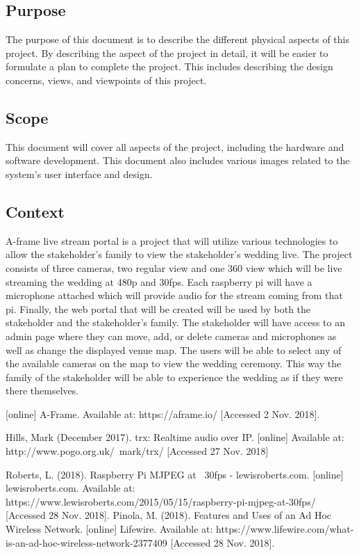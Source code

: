 \documentclass[onecolumn, draftclsnofoot,10pt, compsoc]{IEEEtran}
\begin{document}
    \subsection{Purpose}
    The purpose of this document is to describe the different physical aspects of this project.
    By describing the aspect of the project in detail, it will be easier to formulate a plan to complete the project.
    This includes describing the design concerns, views, and viewpoints of this project.
    
    \subsection{Scope}
    This document will cover all aspects of the project, including the hardware and software development.
    This document also includes various images related to the system's user interface and design.
    
    \subsection{Context}
    A-frame live stream portal is a project that will utilize various technologies to allow the stakeholder's family to view the stakeholder's wedding live.
    The project consists of three cameras, two regular view and one 360 view which will be live streaming the wedding at 480p and 30fps. 
    Each raspberry pi will have a microphone attached which will provide audio for the stream coming from that pi.
    Finally, the web portal that will be created will be used by both the stakeholder and the stakeholder's family.
    The stakeholder will have access to an admin page where they can move, add, or delete cameras and microphones as well as change the displayed venue map.
    The users will be able to select any of the available cameras on the map to view the wedding ceremony.
    This way the family of the stakeholder will be able to experience the wedding as if they were there themselves.
    
\begin{thebibliography}{}
[online] A-Frame. Available at: https://aframe.io/ [Accessed 2 Nov. 2018].

Hills, Mark (December 2017). trx: Realtime audio over IP.
[online] Available at: http://www.pogo.org.uk/~mark/trx/
[Accessed 27 Nov. 2018]

Roberts, L. (2018). Raspberry Pi MJPEG at ~30fps - lewisroberts.com. [online] lewisroberts.com. Available at: https://www.lewisroberts.com/2015/05/15/raspberry-pi-mjpeg-at-30fps/ [Accessed 28 Nov. 2018].
Pinola, M. (2018). Features and Uses of an Ad Hoc Wireless Network. [online] Lifewire. Available at: https://www.lifewire.com/what-is-an-ad-hoc-wireless-network-2377409 [Accessed 28 Nov. 2018].
\end{thebibliography}
\end{document}
